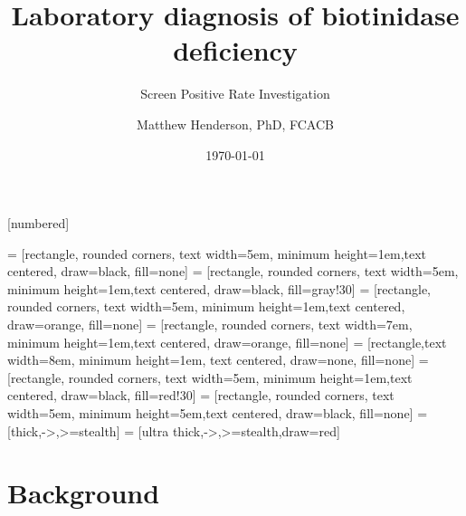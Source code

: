 \documentclass[presentation, smaller]{beamer}
\author{Matthew Henderson, PhD, FCACB}
\date{\today}
\title{Laboratory diagnosis of biotinidase deficiency}
\subtitle{Screen Positive Rate Investigation}
\institute[NSO]{Newborn Screening Ontario}
\begin{document}
\maketitle


\vspace{220pt}
\beamertemplatenavigationsymbolsempty
{}[numbered]


 = [rectangle, rounded corners, text width=5em, minimum height=1em,text centered, draw=black, fill=none]
 = [rectangle, rounded corners, text width=5em, minimum height=1em,text centered, draw=black, fill=gray!30]
 = [rectangle, rounded corners, text width=5em, minimum height=1em,text centered, draw=orange, fill=none]
 = [rectangle, rounded corners, text width=7em, minimum height=1em,text centered, draw=orange, fill=none]
 = [rectangle,text width=8em, minimum height=1em, text centered, draw=none, fill=none]
 = [rectangle, rounded corners, text width=5em, minimum height=1em,text centered, draw=black, fill=red!30]
 = [rectangle, rounded corners, text width=5em, minimum height=5em,text centered, draw=black, fill=none]
 = [thick,->,>=stealth]
 = [ultra thick,->,>=stealth,draw=red]

\section{Background}
\label{sec:orgheadline7}
\end{document}
